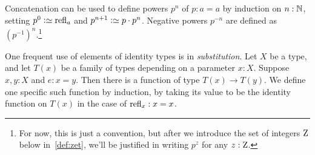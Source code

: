 Concatenation can be used to define powers $p^n$ of $p:a=a$
by induction on $n:\mathbb{N}$, setting $p^0\defeq\refl{a}$ and
$p^{n+1}\defeq p\cdot p^n$. Negative powers $p^{-n}$ are defined
as $(p^{-1})^n$.\footnote{For now, this is just a convention,
  but after we introduce the set of integers $\mathrm{Z}$ below in~\cref{def:zet},
  we'll be justified in writing $p^z$ for any $z:\mathrm{Z}$.}

One frequent use of elements of identity types is in \emph{substitution}.%
Let $X$ be a type, and let $T(x)$ be a family of types depending on a
parameter $x:X$.  Suppose $x,y:X$ and $e:x=y$.  
Then there is a function of type $T(x) \to T(y)$. 
We define one specific such function by induction, 
by taking its value to be the identity function on $T(x)$ 
in the case of $\mathrm{refl}_{x}:x=x$.

